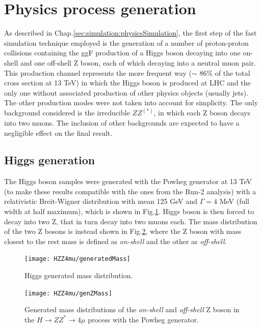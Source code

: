 \documentclass[a4paper,twoside,12pt]{book}
\begin{document}
\section{Physics process generation}
As described in Chap.\ref{sec:simulation:physicsSimulation}, the first step of the fast simulation 
technique employed is the generation of a number of proton-proton collisions containing the
ggF production of a Higgs boson decaying into one on-shell and one off-shell Z boson, 
each of which decaying into a neutral muon pair. This production channel represents the more
frequent way ($\sim$ 86\% of the total cross section at 13 TeV) in which the Higgs boson is produced at LHC and the only one without 
associated production of other physics objects (usually jets). The other production modes were not taken
into account for simplicity. The only background considered is the irreducible $ZZ^{(*)}$, 
in which each Z boson decays into two muons. The inclusion of other backgrounds are expected to 
have a negligible effect on the final result\cite{scoping}.

\subsection{Higgs generation}

The Higgs boson samples were generated with the Powheg\cite{Powheg} generator at 13 TeV (to make these results compatible with the ones from the
Run-2 analysis) with a 
relativistic Breit-Wigner distribution with mean 125 GeV and $\Gamma = 4$ MeV (full
width at half maximum), which 
is shown in Fig.\ref{fig:HZZ4mu:generatedHiggs}. Higgs boson
is then forced to decay into two Z, that in turn decay into two muons each. The mass distribution of the two Z bosons is instead shown in Fig.\ref{fig:HZZ4mu:generatedZMass}, where the Z boson with mass closest to the rest mass
is defined as \textit{on-shell} and the other as \textit{off-shell}.


\begin{figure}
\centering
\texttt{[image: HZZ4mu/generatedMass]}
\caption{}
\caption{Higgs generated mass distribution.}
\label{fig:HZZ4mu:generatedHiggs}
\end{figure}


\begin{figure}
\centering
  \texttt{[image: HZZ4mu/genZMass]}
  \caption{Generated mass distributions of the \textit{on-shell} and \textit{off-shell} Z boson 
  in the $H \rightarrow ZZ^{*} \rightarrow 4\mu$ process with the Powheg generator.}
\label{fig:HZZ4mu:generatedZMass}
\end{figure}
\end{document}
